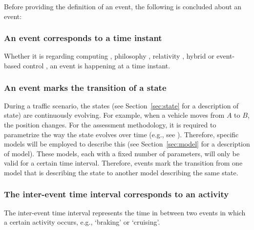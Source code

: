 Before providing the definition of an event, the following is concluded about an event:

\subsubsection{An event corresponds to a time instant}
Whether it is regarding computing \cite{breu1997towards}, philosophy \cite{kim1993supervenience}, relativity \cite{sartori1996understanding}, hybrid or event-based control \cite{branicky1998hybridcontrol, boel1999hybridcontrol, heemels2012eventcontrol}, an event is happening at a time instant.

\subsubsection{An event marks the transition of a state}
During a traffic scenario, the states (see Section~\ref{sec:state} for a description of state) are continuously evolving. For example, when a vehicle moves from $A$ to $B$, the position changes. For the assessment methodology, it is required to parametrize the way the state evolves over time (e.g., see \cite{deGelder2017assessment}). Therefore, specific models will be employed to describe this (see Section~\ref{sec:model} for a description of model). These models, each with a fixed number of parameters, will only be valid for a certain time interval. Therefore, events mark the transition from one model that is describing the state to another model describing the same state.

\subsubsection{The inter-event time interval corresponds to an activity}
The inter-event time interval represents the time in between two events in which a certain activity occurs, e.g., `braking' or `cruising'.


